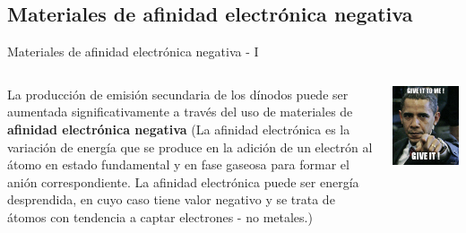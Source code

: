 \documentclass[a4paper,10pt]{beamer}
\begin{document}
\subsection{Materiales de afinidad electrónica negativa}
\begin{frame}{Materiales de afinidad electrónica negativa - I}

\begin{columns}[c]

\column{2.3in}
\begin{justify}
\begin{footnotesize}
 La producción de emisión secundaria de los dínodos puede ser aumentada significativamente 
 a través del uso de materiales de \textbf{afinidad electrónica negativa} (La afinidad electrónica es la 
 variación de energía que se produce en la adición de un electrón al átomo en estado fundamental
 y en fase gaseosa para formar el anión correspondiente. La afinidad electrónica puede ser energía desprendida,
 en cuyo caso tiene valor negativo y se trata de átomos con tendencia a captar electrones - no metales.)
 \end{footnotesize}
 \end{justify}
 \column{2in}
 
 \begin{center}
  \includegraphics[scale=0.2]{fig9}
 \end{center}



\end{columns}
\end{frame}
\end{document}
